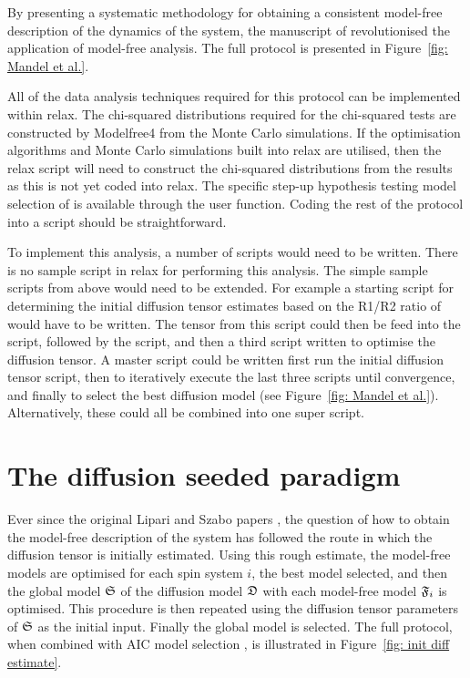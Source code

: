\begin{htmlonly}
\begin{htmlonly}
By presenting a systematic methodology for obtaining a consistent model-free description of the dynamics of the system, the manuscript of \citet{Mandel95} revolutionised the application of model-free analysis.
The full protocol is presented in Figure~\ref{fig: Mandel et al.}.

All of the data analysis techniques required for this protocol can be implemented within relax.
The chi-squared distributions required for the chi-squared tests are constructed by Modelfree4 from the Monte Carlo simulations.
If the optimisation algorithms and Monte Carlo simulations built into relax are utilised, then the relax script will need to construct the chi-squared distributions from the results as this is not yet coded into relax.
The specific step-up hypothesis testing model selection of \citet{Mandel95} is available through the  user function.
Coding the rest of the protocol into a script should be straightforward.

To implement this analysis, a number of scripts would need to be written.
There is no sample script in relax for performing this analysis.
The simple sample scripts from above would need to be extended.
For example a starting script for determining the initial diffusion tensor estimates based on the R1/R2 ratio of \citet{Kay89} would have to be written.
The tensor from this script could then be feed into the  script, followed by the  script, and then a third script written to optimise the diffusion tensor.
A master script could be written first run the initial diffusion tensor script, then to iteratively execute the last three scripts until convergence, and finally to select the best diffusion model (see Figure~\ref{fig: Mandel et al.}).
Alternatively, these could all be combined into one super script.




\section{The diffusion seeded paradigm}
\label{sect: diffusion seeded paradigm}

Ever since the original Lipari and Szabo papers \citep{LipariSzabo82a, LipariSzabo82b}, the question of how to obtain the model-free description of the system has followed the route in which the diffusion tensor is initially estimated.
Using this rough estimate, the model-free models are optimised for each spin system $i$, the best model selected, and then the global model $\mathfrak{S}$ of the diffusion model $\mathfrak{D}$ with each model-free model $\mathfrak{F}_i$ is optimised.
This procedure is then repeated using the diffusion tensor parameters of $\mathfrak{S}$ as the initial input.
Finally the global model is selected.
The full protocol, when combined with AIC model selection \citep{dAuvergneGooley03}, is illustrated in Figure~\ref{fig: init diff estimate}.



\end{htmlonly}
\end{htmlonly}
